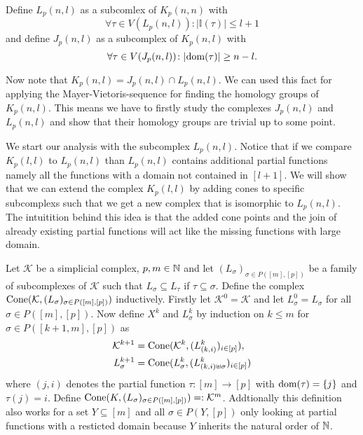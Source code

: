 \begin{defin}
  Define $L_p(n,l)$ as a subcomlex of $K_p(n,n)$ with \[\forall\tau\in V(L_p(n,l))\colon |\mathbb{I}(\tau)| \leq l+1 \]
  and define $J_p(n,l)$ as a subcomplex of $K_p(n,l)$ with \[\forall \tau \in V(J_p(n,l))\colon |{\rm dom}(\tau)| \geq n-l.\]
\end{defin}

Now note that $K_p(n,l) = J_p(n,l) \cap L_p(n,l)$. We can used this fact for applying the Mayer-Vietoris-sequence for finding the homology groups of $K_p(n,l)$. This means we have to firstly study the complexes $J_p(n,l)$ and $L_p(n,l)$ and show that their homology groups are trivial up to some point.

We start our analysis with the subcomplex $L_p(n,l)$. Notice that if we compare $K_p(l,l)$ to $L_p(n,l)$ than $L_p(n,l)$ contains additional partial functions namely all the functions with a domain not contained in $[l+1]$. We will show that we can extend the complex $K_p(l,l)$ by adding cones to specific subcomplexs such that we get a new complex that is isomorphic to $L_p(n,l)$. The intuitition behind this idea is that the added cone points and the join of already existing partial functions will act like the missing functions with large domain. 

\begin{defin}
  Let $\mathcal{K}$ be a simplicial complex, $p,m \in \mathbb{N}$ and let $(L_\sigma)_{\sigma \in P([m],[p])}$ be a family of subcomplexes of $\mathcal{K}$ such that $L_\sigma \subseteq L_\tau$ if $\tau \subseteq \sigma$. Define the complex ${\rm Cone}(\mathcal{K}, (L_\sigma)_{\sigma\in P([m],[p])})$ inductively. Firstly let $\mathcal{K}^0 = \mathcal{K}$ and let $L_\sigma^0 = L_\sigma$ for all $\sigma \in P([m],[p])$. Now define $X^k$ and $L_\sigma^k$ by induction on $k \leq m$ for $\sigma \in P([k+1,m], [p])$ as
  \begin{align*}
    \mathcal{K}^{k+1} &= {\rm Cone}(\mathcal{K}^k, (L^k_{(k,i)})_{i\in [p]}), \\
    L^{k+1}_\sigma &= {\rm Cone}(L^k_\sigma, (L^k_{(k,i) \uplus \sigma})_{i\in [p]})
  \end{align*}
  where $(j,i)$ denotes the partial function $\tau\colon [m] \to [p]$ with ${\rm dom}(\tau) = \{j\}$ and $\tau(j) = i$. Define ${\rm Cone}(K, (L_\sigma)_{\sigma \in P([m],[p])}) =: \mathcal{K}^m$.
  Addtionally this definition also works for a set $Y \subseteq [m]$ and all $\sigma \in P(Y, [p])$ only looking at partial functions with a resticted domain because $Y$ inherits the natural order of $\mathbb{N}$.
\end{defin}

